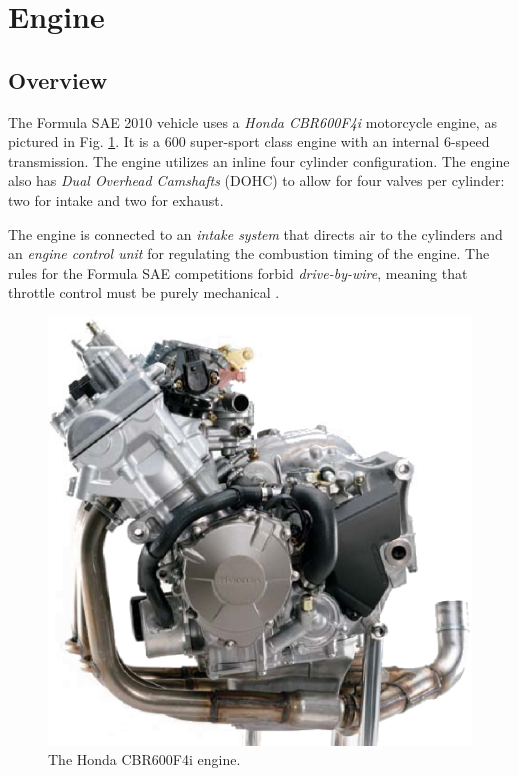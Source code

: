 \section{Engine}

\subsection{Overview}


The Formula SAE 2010 vehicle uses a \emph{Honda CBR600F4i} motorcycle engine, as pictured in Fig. \ref{fig:cbr600f4i_engine}. It is a \unit{600}{\centi\cubic\metre} super-sport class engine with an internal 6-speed transmission. The engine utilizes an inline four cylinder configuration. The engine also has \emph{Dual Overhead Camshafts} (DOHC) to allow for four valves per cylinder: two for intake and two for exhaust.

The engine is connected to an \emph{intake system} that directs air to the cylinders and an \emph{engine control unit} for regulating the combustion timing of the engine. The rules for the Formula SAE competitions forbid \emph{drive-by-wire}, meaning that throttle control must be purely mechanical \cite{2010fsaerules}.

\begin{figure}[H]
	\centering
	 	\includegraphics[scale=0.5]{background/figures/cbr600f4i_engine.eps}
    \caption{The Honda CBR600F4i engine.}
    \label{fig:cbr600f4i_engine}
\end{figure}

